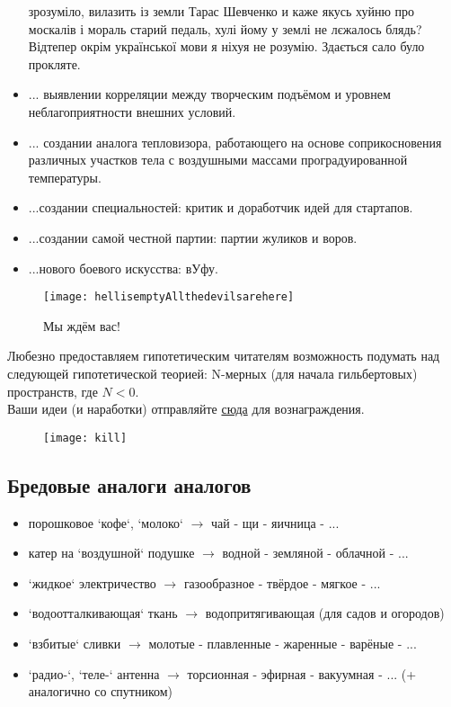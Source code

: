 \begin{itemize}
{            зрозуміло, вилазить із земли Тарас Шевченко и каже якусь хуйню про москалів і мораль старий педаль, 
            хулі йому у землі не лєжалось блядь? Відтепер окрім української мови я ніхуя не розумію. Здається 
            сало було прокляте.}
    \item ... выявлении корреляции между творческим подъёмом и уровнем неблагоприятности внешних условий.
    \item ... создании аналога тепловизора, работающего на основе соприкосновения различных участков тела с воздушными массами проградуированной температуры.
    \item ...создании специальностей: критик и доработчик идей для стартапов.
    \item ...создании самой честной партии: партии жуликов и воров.
    \item ...нового боевого искусства: вУфу.
\end{itemize}
\begin{figure}[ht!]
    \centering
    \texttt{[image: hellisemptyAllthedevilsarehere]}
    \caption{Мы ждём вас!}
\end{figure}

Любезно предоставляем гипотетическим читателям возможность подумать над следующей гипотетической теорией:
N-мерных (для начала гильбертовых) пространств, где \( N < 0 \).\\
Ваши идеи (и наработки) отправляйте \href{http://www.abelprize.no/}{сюда} для вознаграждения.
\begin{figure}[ht!]
    \centering
    \texttt{[image: kill]}
\end{figure}
\subsection{Бредовые аналоги аналогов}
\begin{itemize}
\item порошковое `кофе`, `молоко` \( \to \) чай - щи - яичница - ...
\item катер на `воздушной` подушке \( \to \) водной - земляной - облачной - ...
\item `жидкое` электричество \( \to \) газообразное - твёрдое - мягкое - ...
\item `водоотталкивающая` ткань \( \to \) водопритягивающая (для садов и огородов)
\item `взбитые` сливки \( \to \) молотые - плавленные - жаренные - варёные - ...
\item `радио-`, `теле-` антенна \( \to \) торсионная - эфирная - вакуумная - ... (+ аналогично со спутником)
\end{itemize}
